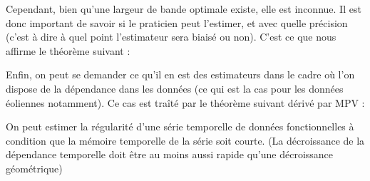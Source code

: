 Cependant, bien qu'une largeur de bande optimale existe, elle est inconnue. Il est donc important de savoir si le praticien peut l'estimer, et avec quelle précision (c'est à dire à quel point l'estimateur sera biaisé ou non). C'est ce que nous affirme le théorème suivant :

\pagebreak

\begin{thm*}
    \noindent{}

    \label{thm*:h_opt_estim}
\end{thm*}


Enfin, on peut se demander ce qu'il en est des estimateurs dans le cadre où l'on dispose de la dépendance dans les données (ce qui est la cas pour les données éoliennes notamment). Ce cas est traîté par le théorème suivant dérivé par MPV :

\begin{thm*}

    On peut estimer la régularité d'une série temporelle de données fonctionnelles à condition que la mémoire temporelle de la série soit courte. (La décroissance de la dépendance temporelle doit être au moins aussi rapide qu'une décroissance géométrique)

    \label{thm*:far_adaptative_estimation}
\end{thm*}
